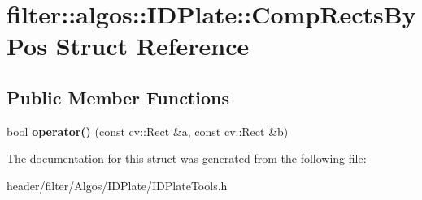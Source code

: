 \hypertarget{structfilter_1_1algos_1_1_i_d_plate_1_1_comp_rects_by_pos}{}\section{filter\+:\+:algos\+:\+:I\+D\+Plate\+:\+:Comp\+Rects\+By\+Pos Struct Reference}
\label{structfilter_1_1algos_1_1_i_d_plate_1_1_comp_rects_by_pos}
\subsection*{Public Member Functions}
\begin{DoxyCompactItemize}
\item 
\mbox{\label{structfilter_1_1algos_1_1_i_d_plate_1_1_comp_rects_by_pos_af4372fc2241475e6b3c832160d99481c}} 
bool {\bfseries operator()} (const cv\+::\+Rect \&a, const cv\+::\+Rect \&b)
\end{DoxyCompactItemize}


The documentation for this struct was generated from the following file\+:\begin{DoxyCompactItemize}
\item 
header/filter/\+Algos/\+I\+D\+Plate/I\+D\+Plate\+Tools.\+h\end{DoxyCompactItemize}

